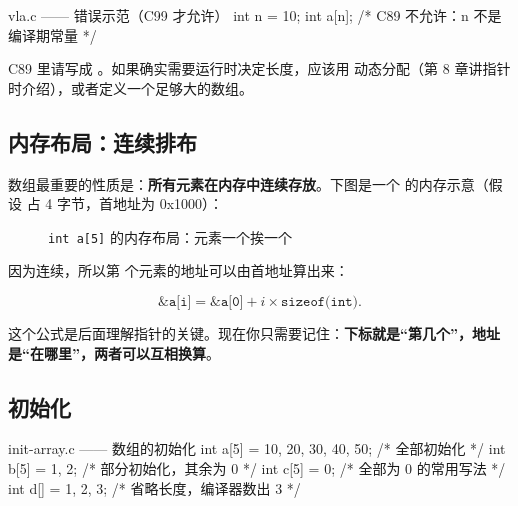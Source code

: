 \begin{c89box}[C89：数组长度必须是常量]
\begin{codebox}{vla.c —— 错误示范（C99 才允许）}
int n = 10;
int a[n];       /* C89 不允许：n 不是编译期常量 */
\end{codebox}
C89 里请写成 。如果确实需要运行时决定长度，应该用  动态分配（第 8 章讲指针时介绍），或者定义一个足够大的数组。
\end{c89box}

\subsection{内存布局：连续排布}

数组最重要的性质是：\textbf{所有元素在内存中连续存放}。下图是一个  的内存示意（假设  占 4 字节，首地址为 0x1000）：

\begin{figure}[htbp]
  \centering
  \caption{\texttt{int a[5]} 的内存布局：元素一个挨一个}
  \label{fig:array-memory}
\end{figure}

因为连续，所以第  个元素的地址可以由首地址算出来：

\[
\texttt{\&a[i]} = \texttt{\&a[0]} + i \times \texttt{sizeof(int)}.
\]

这个公式是后面理解指针的关键。现在你只需要记住：\textbf{下标就是“第几个”，地址是“在哪里”，两者可以互相换算}。

\subsection{初始化}

\begin{codebox}{init-array.c —— 数组的初始化}
int a[5] = {10, 20, 30, 40, 50};  /* 全部初始化 */
int b[5] = {1, 2};                /* 部分初始化，其余为 0 */
int c[5] = {0};                   /* 全部为 0 的常用写法 */
int d[]  = {1, 2, 3};             /* 省略长度，编译器数出 3 */
\end{codebox}

